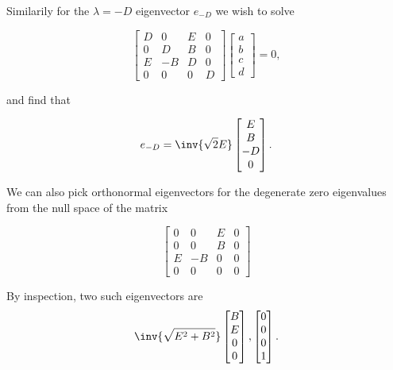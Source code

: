 Similarily for the $\lambda = -D$ eigenvector $e_{-D}$ we wish to solve

\begin{equation}\label{eqn:relElectroDynProblemSet2:630}
\begin{bmatrix}
D & 0 & E & 0 \\
0 & D & B & 0 \\
E & -B & D & 0 \\
0 & 0 & 0 & D
\end{bmatrix} 
\begin{bmatrix} 
a \\
b \\
c \\
d
\end{bmatrix} 
 = 0,
\end{equation}

and find that

\begin{equation}\label{eqn:relElectroDynProblemSet2:650}
e_{-D} = 
\inv{\sqrt{2}E}
\begin{bmatrix} 
E \\
B \\
-D \\
0
\end{bmatrix}.
\end{equation}

We can also pick orthonormal eigenvectors for the degenerate zero eigenvalues from the null space of the matrix

\begin{equation}\label{eqn:relElectroDynProblemSet2:670}
\begin{bmatrix}
0 & 0 & E & 0 \\
0 & 0 & B & 0 \\
E & -B & 0 & 0 \\
0 & 0 & 0 & 0
\end{bmatrix} 
\end{equation}

By inspection, two such eigenvectors are 
\begin{equation}\label{eqn:relElectroDynProblemSet2:690}
\inv{\sqrt{E^2 + B^2}}
\begin{bmatrix} 
B \\
E \\
0 \\
0 
\end{bmatrix},
\begin{bmatrix} 
0 \\
0 \\
0 \\
1 
\end{bmatrix}.
\end{equation}

